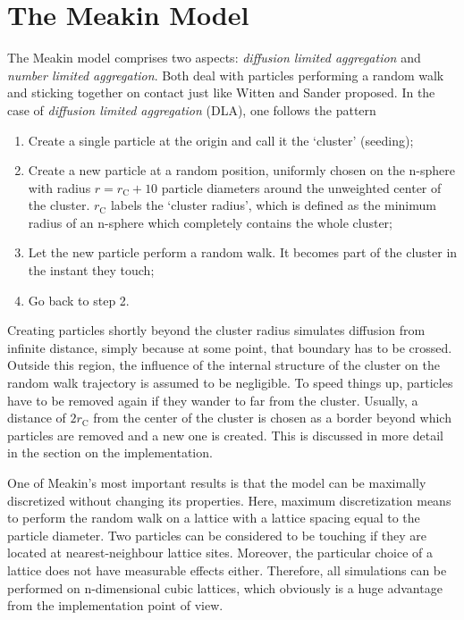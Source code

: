 \documentclass[twocolumn,10pt]{scrartcl}
\begin{document}
    \section{The Meakin Model}
        The Meakin model comprises two aspects: \emph{diffusion limited aggregation} and \emph{number limited
        aggregation}. Both deal with particles performing a random walk and sticking together on contact just like
        Witten and Sander proposed. In the case of \emph{diffusion limited aggregation} (DLA), one follows the
        pattern
        \begin{enumerate}
            \item Create a single particle at the origin and call it the `cluster' (seeding);
            \item Create a new particle at a random position, uniformly chosen on the n-sphere with radius
                $r=r_\mathrm{C}+10$ particle diameters around the unweighted center of the cluster.
                $r_\mathrm{C}$ labels the `cluster radius', which
                is defined as the minimum radius of an n-sphere which completely contains the whole cluster;
            \item Let the new particle perform a random walk. It becomes part of the cluster in the instant
                they touch;
            \item Go back to step 2.
        \end{enumerate}
        Creating particles shortly beyond the cluster radius simulates diffusion from infinite distance, simply
        because at some point, that boundary has to be crossed. Outside this region, the influence of the
        internal structure of the cluster on the random walk trajectory is assumed to be negligible. To speed things up,
        particles have to be removed again if they wander to far from the cluster. Usually, a distance of
        $2r_\mathrm{C}$ from the center of the cluster is chosen as a border beyond which particles are removed
        and a new one is created. This is discussed in more detail in the section on the implementation.
       
        One of Meakin's most important results is that the model can be maximally discretized without changing
        its properties. Here, maximum discretization means to perform the random walk on a lattice with
        a lattice spacing equal to the particle diameter. Two particles can be considered to be touching if
        they are located at nearest-neighbour lattice sites. Moreover, the particular choice of a lattice does
        not have measurable effects either. Therefore, all simulations can be performed on n-dimensional
        cubic lattices, which obviously is a huge advantage from the implementation point of view.
\end{document}
